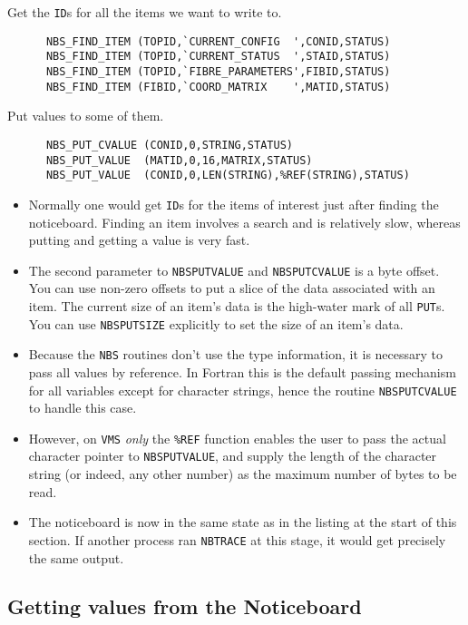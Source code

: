 \documentclass[twoside,11pt]{article}
\renewcommand{\_}{\texttt{\symbol{95}}}
\begin{document}
Get the {\tt ID}s for all the items we want to write to.

\begin {verbatim}
      NBS_FIND_ITEM (TOPID,`CURRENT_CONFIG  ',CONID,STATUS)
      NBS_FIND_ITEM (TOPID,`CURRENT_STATUS  ',STAID,STATUS)
      NBS_FIND_ITEM (TOPID,`FIBRE_PARAMETERS',FIBID,STATUS)
      NBS_FIND_ITEM (FIBID,`COORD_MATRIX    ',MATID,STATUS)
\end{verbatim}

Put values to some of them.

\begin {verbatim}
      NBS_PUT_CVALUE (CONID,0,STRING,STATUS)
      NBS_PUT_VALUE  (MATID,0,16,MATRIX,STATUS)
      NBS_PUT_VALUE  (CONID,0,LEN(STRING),%
\end{verbatim}

\begin {itemize}
\item Normally one would get {\tt ID}s for the items of interest just after
finding the noticeboard. Finding an item involves a search and is relatively
slow, whereas putting and getting a value is very fast.
\item The second parameter to {\tt NBS\_PUT\_VALUE} and {\tt NBS\_PUT\_CVALUE}
is a byte offset. You
can use non-zero offsets to put a slice of the data associated with an item.
The current size of an item's data is the high-water mark of all {\tt PUT}s.
You can use {\tt NBS\_PUT\_SIZE} explicitly to set the size of an item's data.
\item Because the {\tt NBS} routines don't use the type information, it is
necessary to pass all values by reference. In Fortran this is the default
passing mechanism for all variables except for character strings, hence the
routine {\tt NBS\_PUT\_CVALUE} to handle this case.
\item However, on {\tt VMS} {\em only} the {\tt \%REF} function enables the
user to pass the actual character pointer to {\tt NBS\_PUT\_VALUE}, and supply
the length of the character string (or indeed, any other number) as the
maximum number of bytes to be read.
\item The noticeboard is now in the same state as in the listing at the start
of this section. If another process ran {\tt NBTRACE} at this stage, it would get
precisely the same output.
\end {itemize}

\subsection {Getting values from the Noticeboard}
\end{document}
